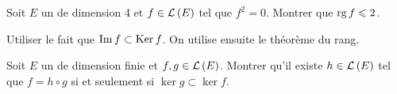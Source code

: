 \documentclass{magnolia}
\begin{document}
Soit $E$ un \Kev de dimension 4 et $f\in\mathcal{L}\left(E\right)$ tel que $f^2=0$. Montrer
que $\operatorname{rg} f\leqslant 2$. 
\begin{sol}
Utiliser le fait que $\operatorname{Im} f\subset\mathop{\rm Ker} f$. On utilise ensuite le théorème
du rang. 
\end{sol}

Soit $E$ un \Kev de dimension finie et $f,g\in\mathcal{L}\left(E\right)$. Montrer qu'il existe
$h\in\mathcal{L}\left(E\right)$ tel que $f=h\circ g$ si et seulement si $\ker g\subset \ker f$.

\end{document}
